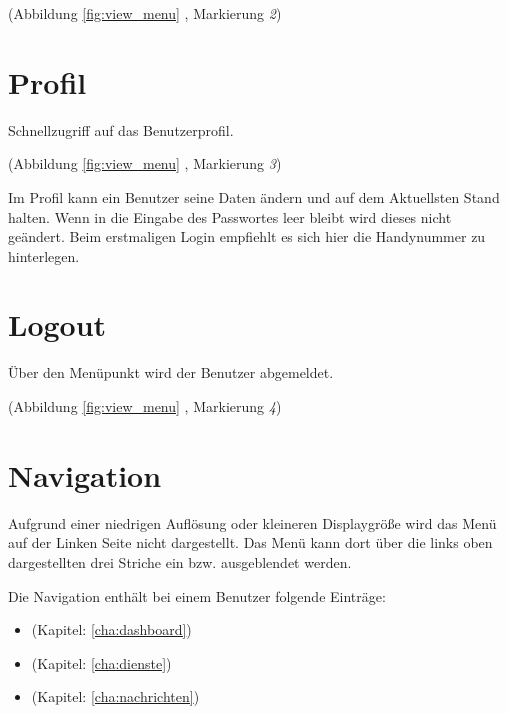 \noindent (Abbildung \ref{fig:view_menu} \textit{}, Markierung \textit{2})

\section{Profil}
\label{sec:menu_profile}
Schnellzugriff auf das Benutzerprofil.

\noindent (Abbildung \ref{fig:view_menu} \textit{}, Markierung \textit{3})

\noindent Im Profil kann ein Benutzer seine Daten ändern und auf dem Aktuellsten Stand halten. Wenn in die Eingabe des Passwortes leer bleibt wird dieses nicht geändert. Beim erstmaligen Login empfiehlt es sich hier die Handynummer zu hinterlegen.  

\section{Logout}
\label{sec:menu_logout}
Über den Menüpunkt wird der Benutzer abgemeldet.

\noindent (Abbildung \ref{fig:view_menu} \textit{}, Markierung \textit{4})

\section{Navigation}
\label{sec:menu_navigation}
Aufgrund einer niedrigen Auflösung oder kleineren Displaygröße wird das Menü auf der Linken Seite nicht dargestellt. Das Menü kann dort über die links oben dargestellten drei Striche ein bzw. ausgeblendet werden.

\noindent Die Navigation enthält bei einem Benutzer folgende Einträge: 
\begin{itemize}
\item {} (Kapitel: \ref{cha:dashboard})
\item {} (Kapitel: \ref{cha:dienste})
\item {} (Kapitel: \ref{cha:nachrichten})
\end{itemize}
